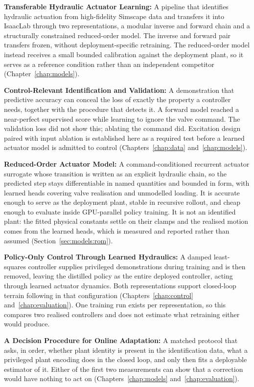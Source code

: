\textbf{Transferable Hydraulic Actuator Learning:} A pipeline that identifies
hydraulic actuation from high-fidelity Simscape data and transfers it into
IsaacLab through two representations, a modular inverse and forward chain and a
structurally constrained reduced-order model. The inverse and forward pair transfers
frozen, without deployment-specific retraining. The reduced-order model instead
receives a small bounded calibration against the deployment plant, so it serves
as a reference condition rather than an independent competitor
(Chapter~\ref{chap:models}).

\textbf{Control-Relevant Identification and Validation:} A demonstration that
predictive accuracy can conceal the loss of exactly the property a controller
needs, together with the procedure that detects it. A forward model reached a
near-perfect supervised score while learning to ignore the valve command. The
validation loss did not show this; ablating the command did. Excitation design
paired with input ablation is established here as a required test before a
learned actuator model is admitted to control
(Chapters~\ref{chap:data} and~\ref{chap:models}).

\textbf{Reduced-Order Actuator Model:} A command-conditioned recurrent actuator
surrogate whose transition is written as an explicit hydraulic chain, so the
predicted step stays differentiable in named quantities and bounded in form,
with learned heads covering valve realisation and unmodelled loading. It is
accurate enough to serve as the deployment plant, stable in recursive rollout,
and cheap enough to evaluate inside GPU-parallel policy training. It is not an
identified plant: the fitted physical constants settle on their clamps and the
realised motion comes from the learned heads, which is measured and reported
rather than assumed (Section~\ref{sec:models:rom}).

\textbf{Policy-Only Control Through Learned Hydraulics:} A damped least-squares
controller supplies privileged demonstrations during training and is then
removed, leaving the distilled policy as the entire deployed controller, acting
through learned actuator dynamics. Both representations support closed-loop
terrain following in that configuration
(Chapters~\ref{chap:control} and~\ref{chap:evaluation}). One training run
exists per representation, so this compares two realised controllers and does
not estimate what retraining either would produce.

\textbf{A Decision Procedure for Online Adaptation:} A matched protocol that
asks, in order, whether plant identity is present in the identification data,
what a privileged plant encoding does in the closed loop, and only then fits a
deployable estimator of it. Either of the first two measurements can show that a
correction would have nothing to act on
(Chapters~\ref{chap:models} and~\ref{chap:evaluation}).

